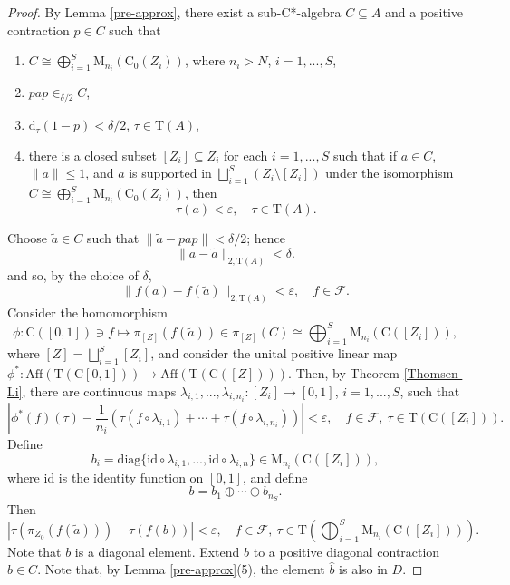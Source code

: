 \documentclass[12pt, oneside, psamsfonts]{amsart}
\theoremstyle{definition}
\theoremstyle{remark}
\numberwithin{equation}{section}
\newcommand{\norm}[1]{\| #1\|}
\newcommand{\abs}[1]{| #1 |}
\newcommand{\eps}{\varepsilon}
\newcommand{\tr}{\mathrm{T}}
\begin{document}
\begin{proof}
By Lemma \ref{pre-approx}, there exist a sub-C*-algebra $C \subseteq A$ and a positive contraction $p \in C$ such that
\begin{enumerate}
\item $C \cong \bigoplus_{i=1}^S \mathrm{M}_{n_i}(\mathrm{C}_0(Z_i))$, where $n_i>N$, $i=1, ..., S$,
\item $pap \in_{\delta/2} C$,
\item $\mathrm{d}_\tau(1-p) < \delta/2$, $\tau \in \tr(A)$,
\item\label{E-condition-4} there is a closed subset $[Z_{i}] \subseteq Z_i$ for each $i=1, ..., S$ such that if $a \in C$, $\norm{a} \leq 1$, and $a$ is supported in $\bigsqcup_{i=1}^S (Z_i \setminus [Z_{i}])$ under the isomorphism $C \cong \bigoplus_{i=1}^S\mathrm{M}_{n_i}(\mathrm{C}_0(Z_i))$, then $$ \tau(a) < \eps, \quad \tau \in \tr(A).$$
\end{enumerate}
Choose $\tilde{a} \in C$ such that $\norm{\tilde{a} - pap} < \delta/2$; hence
$$ \norm{a - \tilde{a}}_{2, \tr(A)} < \delta. $$ 
and so, by the choice of $\delta$, 
\begin{equation}\label{E-equation-1}
 \norm{f(a) - f(\tilde{a})}_{2, \tr(A)} < \eps,\quad f \in \mathcal F. 
 \end{equation}
Consider the homomorphism
$$ \phi: \mathrm{C}([0, 1]) \ni f \mapsto \pi_{[Z]}(f(\tilde{a})) \in \pi_{[Z]}(C) \cong  \bigoplus_{i=1}^S \mathrm{M}_{n_i}(\mathrm{C}([Z_i])),$$
where $[Z] = \bigsqcup_{i=1}^S [Z_i]$, and consider the unital positive linear map
$\phi^*:  \mathrm{Aff}( \tr(\mathrm{C}[0, 1])) \to \mathrm{Aff}(\tr(\mathrm{C}([Z]))).$ Then, by Theorem \ref{Thomsen-Li}, there are continuous maps $\lambda_{i, 1}, ..., \lambda_{i, n_i}: [Z_i] \to [0, 1]$, $i=1, ..., S$, such that
$$\abs{\phi^*(f)(\tau) - \frac{1}{n_i}(\tau(f \circ \lambda_{i, 1}) + \cdots + \tau(f \circ \lambda_{i, n_i}) )} < \eps,\quad f \in \mathcal F,\ \tau \in \tr(\mathrm{C}([Z_i])).$$
Define $$b_i = \mathrm{diag}\{ \mathrm{id} \circ \lambda_{i, 1}, ...,  \mathrm{id} \circ \lambda_{i, n} \} \in \mathrm{M}_{n_i}(\mathrm{C}([Z_i])),$$
where $\mathrm{id}$ is the identity function on $[0, 1]$,
and define 
$$b = b_1 \oplus \cdots \oplus b_{n_S}. $$ 
Then
\begin{equation}\label{E-equation-2}
\abs{\tau(\pi_{Z_0}(f(\tilde{a}))) - \tau(f(b))} < \eps,\quad f \in \mathcal F,\   \tau \in \tr(\bigoplus_{i=1}^S\mathrm{M}_{n_i}(\mathrm{C}([Z_i]))).
\end{equation}
Note that $b$ is a diagonal element. Extend $b$ to a positive diagonal contraction $\hat{b} \in C$. Note that, by Lemma \ref{pre-approx}(5), the element $\hat{b}$ is also in $D$. %

\end{proof}
\end{document}

